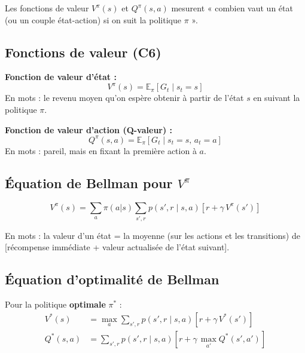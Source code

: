 \documentclass[11pt,a4paper]{article}
\newcommand{\E}{\mathbb{E}}
\begin{document}
\begin{defbox}[Compétences C6, C11]
Les fonctions de valeur $V^\pi(s)$ et $Q^\pi(s,a)$ mesurent « combien vaut un état (ou un couple état-action) si on suit la politique $\pi$ ».
\end{defbox}

\subsection{Fonctions de valeur (C6)}

\textbf{Fonction de valeur d'état :}
\begin{equation}
V^\pi(s) = \E_\pi\!\left[G_t \mid s_t = s\right]
\end{equation}
En mots : le revenu moyen qu'on espère obtenir à partir de l'état $s$ en suivant la politique $\pi$.

\textbf{Fonction de valeur d'action (Q-valeur) :}
\begin{equation}
Q^\pi(s, a) = \E_\pi\!\left[G_t \mid s_t = s,\, a_t = a\right]
\end{equation}
En mots : pareil, mais en fixant la première action à $a$.

\subsection{Équation de Bellman pour $V^\pi$}

\begin{equation}
\boxed{V^\pi(s) = \sum_{a} \pi(a|s) \sum_{s', r} p(s', r \mid s, a)\left[r + \gamma\, V^\pi(s')\right]}
\label{eq:bellman_v}
\end{equation}

En mots : la valeur d'un état = la moyenne (sur les actions et les transitions) de [récompense immédiate + valeur actualisée de l'état suivant].

\subsection{Équation d'optimalité de Bellman}

Pour la politique \textbf{optimale} $\pi^*$ :
\begin{align}
V^*(s) &= \max_a \sum_{s', r} p(s', r \mid s, a)\left[r + \gamma\, V^*(s')\right] \label{eq:bellman_opt_v} \\
Q^*(s, a) &= \sum_{s', r} p(s', r \mid s, a)\left[r + \gamma\, \max_{a'} Q^*(s', a')\right] \label{eq:bellman_opt_q}
\end{align}
\end{document}
